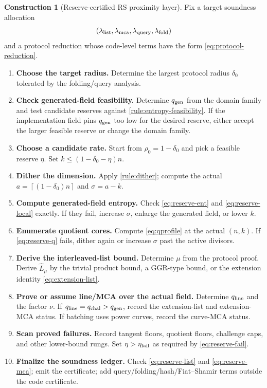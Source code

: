 \documentclass[11pt]{article}
\theoremstyle{definition}
\newtheorem{construction}[theorem]{Construction}
\newcommand{\qgen}{q_{\rm gen}}
\newcommand{\qchal}{q_{\rm chal}}
\newcommand{\qline}{q_{\rm line}}
\newcommand{\ceil}[1]{\left\lceil #1\right\rceil}
\begin{document}
\begin{construction}[Reserve-certified RS proximity layer]
\label{con:layer}
Fix a target soundness allocation
\[
        (\lambda_{\rm list},\lambda_{\rm mca},\lambda_{\rm query},\lambda_{\rm fold})
\]
and a protocol reduction whose code-level terms have the form \eqref{eq:protocol-reduction}.
\begin{enumerate}[label=\textbf{Step \arabic*.},leftmargin=3.2em]
\item \textbf{Choose the target radius.}  Determine the largest protocol radius $\delta_0$ tolerated by the folding/query analysis.
\item \textbf{Check generated-field feasibility.}  Determine $\qgen$ from the domain family and test candidate reserves against \cref{rule:entropy-feasibility}.  If the implementation field pins $\qgen$ too low for the desired reserve, either accept the larger feasible reserve or change the domain family.
\item \textbf{Choose a candidate rate.}  Start from $\rho_0=1-\delta_0$ and pick a feasible reserve $\eta$.  Set $k\le(1-\delta_0-\eta)n$.
\item \textbf{Dither the dimension.}  Apply \cref{rule:dither}; compute the actual $a=\ceil{(1-\delta_0)n}$ and $\sigma=a-k$.
\item \textbf{Compute generated-field entropy.}  Check \eqref{eq:reserve-ent} and \eqref{eq:reserve-local} exactly.  If they fail, increase $\sigma$, enlarge the generated field, or lower $k$.
\item \textbf{Enumerate quotient cores.}  Compute \eqref{eq:qprofile} at the actual $(n,k)$.  If \eqref{eq:reserve-q} fails, dither again or increase $\sigma$ past the active divisors.
\item \textbf{Derive the interleaved-list bound.}  Determine $\mu$ from the protocol proof.  Derive $\widehat L_{\mu}$ by the trivial product bound, a GGR-type bound, or the extension identity \eqref{eq:extension-list}.
\item \textbf{Prove or assume line/MCA over the actual field.}  Determine $\qline$ and the factor $\nu$.  If $\qline=\qchal>\qgen$, record the extension-list and extension-MCA status.  If batching uses power curves, record the curve-MCA status.
\item \textbf{Scan proved failures.}  Record tangent floors, quotient floors, challenge caps, and other lower-bound rungs.  Set $\eta>\eta_{\rm fail}$ as required by \eqref{eq:reserve-fail}.
\item \textbf{Finalize the soundness ledger.}  Check \eqref{eq:reserve-list} and \eqref{eq:reserve-mca}; emit the certificate; add query/folding/hash/Fiat--Shamir terms outside the code certificate.
\end{enumerate}
\end{construction}
\end{document}
